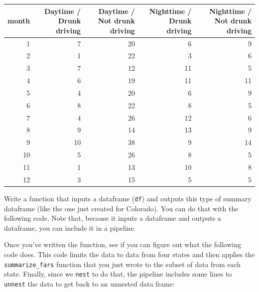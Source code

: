 \documentclass[]{book}
\makeatletter
\newenvironment{Shaded}{\begin{snugshade}}{\end{snugshade}}
\newcommand{\KeywordTok}[1]{\textcolor[rgb]{0.13,0.29,0.53}{\textbf{#1}}}
\newcommand{\DataTypeTok}[1]{\textcolor[rgb]{0.13,0.29,0.53}{#1}}
\newcommand{\StringTok}[1]{\textcolor[rgb]{0.31,0.60,0.02}{#1}}
\newcommand{\ControlFlowTok}[1]{\textcolor[rgb]{0.13,0.29,0.53}{\textbf{#1}}}
\newcommand{\OperatorTok}[1]{\textcolor[rgb]{0.81,0.36,0.00}{\textbf{#1}}}
\newcommand{\NormalTok}[1]{#1}
\newenvironment{kframe}{%
\medskip{}
\setlength{\fboxsep}{.8em}
 \def\at@end@of@kframe{}%
 \ifinner\ifhmode%
  \def\at@end@of@kframe{\end{minipage}}%
  \begin{minipage}{\columnwidth}%
 \fi\fi%
 \def\FrameCommand##1{\hskip\@totalleftmargin \hskip-\fboxsep
 \colorbox{shadecolor}{##1}\hskip-\fboxsep
     \hskip-\linewidth \hskip-\@totalleftmargin \hskip\columnwidth}%
 \MakeFramed {\advance\hsize-\width
   \@totalleftmargin\z@ \linewidth\hsize
   \@setminipage}}%
 {\par\unskip\endMakeFramed%
 \at@end@of@kframe}
\renewenvironment{Shaded}{\begin{kframe}}{\end{kframe}}
\theoremstyle{definition}
\theoremstyle{definition}
\theoremstyle{definition}
\theoremstyle{remark}
\makeatother
\begin{document}
\begin{tabular}{r|r|r|r|r}
\hline
month & Daytime / Drunk driving & Daytime / Not drunk driving & Nighttime / Drunk driving & Nighttime / Not drunk driving\\
\hline
1 & 7 & 20 & 6 & 9\\
\hline
2 & 1 & 22 & 3 & 6\\
\hline
3 & 7 & 12 & 11 & 5\\
\hline
4 & 6 & 19 & 11 & 11\\
\hline
5 & 4 & 20 & 6 & 9\\
\hline
6 & 8 & 22 & 8 & 5\\
\hline
7 & 4 & 26 & 12 & 6\\
\hline
8 & 9 & 14 & 13 & 9\\
\hline
9 & 10 & 38 & 9 & 14\\
\hline
10 & 5 & 26 & 8 & 5\\
\hline
11 & 1 & 13 & 10 & 8\\
\hline
12 & 3 & 15 & 5 & 5\\
\hline
\end{tabular}

Write a function that inputs a dataframe (\texttt{df}) and outputs this
type of summary dataframe (like the one just created for Colorado). You
can do that with the following code. Note that, because it inputs a
dataframe and outputs a dataframe, you can include it in a pipeline.

\begin{Shaded}
\end{Shaded}

Once you've written the function, see if you can figure out what the
following code does. This code limits the data to data from four states
and then applies the \texttt{summarize\_fars} function that you just
wrote to the subset of data from each state. Finally, since we
\texttt{nest} to do that, the pipeline includes some lines to
\texttt{unnest} the data to get back to an unnested data frame:
\end{document}

